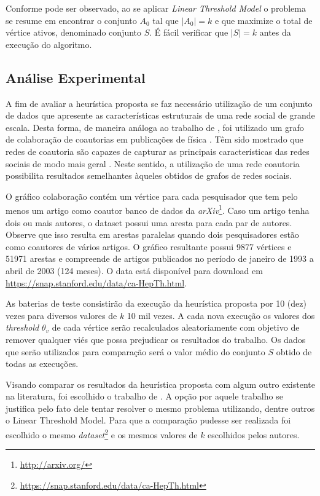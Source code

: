 \documentclass[12pt]{article}
\begin{document}
Conforme pode ser observado, ao se aplicar \textit{Linear Threshold Model} o problema se resume em encontrar o conjunto $A_{0}$  tal que $|A_{0}| = k$ e que maximize o total de vértice ativos, denominado conjunto $S${}. É fácil verificar que $|S| = k$ antes da execução do algoritmo. 

\subsection{Análise Experimental}
\label{subsec:experimentos}

A fim de avaliar a heurística proposta se faz necessário  utilização de um conjunto de dados que apresente as características estruturais de uma rede social de grande escala. Desta forma, de maneira análoga ao trabalho de \cite{kempe2003maximizing}, foi utilizado um grafo de colaboração de coautorias em publicações de física \cite{snapnets}. Têm sido mostrado que redes de coautoria são capazes de capturar as principais características das redes sociais de modo mais geral \cite{newman2001structure}. Neste sentido, a utilização de uma rede coautoria possibilita resultados semelhantes àqueles obtidos de grafos de redes sociais.

O gráfico colaboração contém um vértice para cada pesquisador que tem pelo menos um artigo como coautor banco de dados da \textit{arXiv}\footnote{\url{http://arxiv.org/}}. Caso um artigo tenha dois ou mais autores, o dataset  possui uma aresta para cada par de autores. Observe que isso resulta em arestas paralelas quando dois pesquisadores estão como coautores de vários artigos. O gráfico resultante possui 9877 vértices e 51971 arestas e compreende de artigos publicados no período de janeiro de 1993 a abril de 2003 (124 meses). O data está disponível para download em \url{https://snap.stanford.edu/data/ca-HepTh.html}.

As baterias de teste consistirão da execução da heurística proposta por 10 (dez) vezes para diversos valores de $k$ 10 mil vezes. A cada nova execução os valores dos \textit{threshold} $\theta_v$ de cada vértice serão recalculados aleatoriamente com objetivo de remover qualquer viés que possa prejudicar os resultados do trabalho. Os dados que serão utilizados para comparação será o valor médio do conjunto $S$ obtido de todas as execuções. 

Visando comparar os resultados da heurística proposta com algum outro existente na literatura, foi escolhido o trabalho de \cite{kempe2003maximizing}. A opção por aquele trabalho se justifica pelo fato dele tentar resolver o mesmo problema utilizando, dentre outros o {Linear Threshold Model}{}. Para que a comparação pudesse ser realizada foi escolhido o mesmo \textit{dataset}\footnote{\url{https://snap.stanford.edu/data/ca-HepTh.html}} e os mesmos valores de $k$ escolhidos pelos autores.
\end{document}
